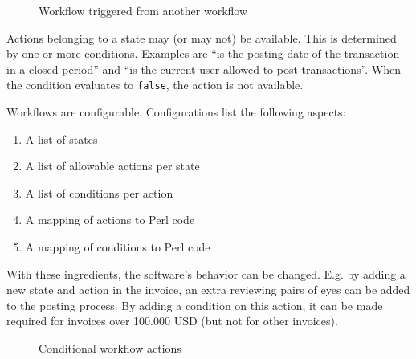 \begin{figure}
\caption{Workflow triggered from another workflow}
\label{fig:triggered-workflow}
\end{figure}

Actions belonging to a state may (or may not) be available. This is determined by one or
more conditions.  Examples are ``is the posting date of the transaction in a closed period''
and ``is the current user allowed to post transactions''.  When the condition evaluates to
\texttt{false}, the action is not available.

Workflows are configurable. Configurations list the following aspects:

\begin{enumerate}
	\item A list of states
	\item A list of allowable actions per state
	\item A list of conditions per action
	\item A mapping of actions to Perl code
	\item A mapping of conditions to Perl code
\end{enumerate}

With these ingredients, the software's behavior can be changed.  E.g. by adding a new state
and action in the invoice, an extra reviewing pairs of eyes can be added to the posting process.
By adding a condition on this action, it can be made required for invoices over 100.000 USD
(but not for other invoices).

\begin{figure}
\caption{Conditional workflow actions}
\label{fig:conditional-workflows}
\end{figure}

